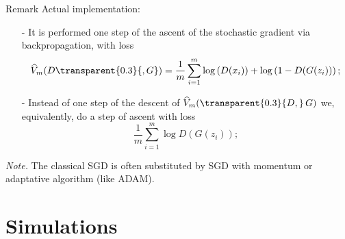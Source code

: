 \documentclass{beamer}
\begin{document}
	\begin{frame}
		\begin{block}{Remark}
			Actual implementation:
			\begin{itemize}
				\item[-] 
					{} It is performed one step of the ascent of the stochastic gradient via backpropagation, with loss 
					\vspace{-0.3cm}
					\begin{equation*}
						\widehat{V}_m(D {\transparent{0.3}{, G}}) = \frac{1}{m} \sum_{i = 1}^{m} \log{D(x_i)} + \log{1 - D(G(z_i))};
					\end{equation*}
					\vspace{-0.6cm}
				\item[-] 
				{} Instead of one step of the descent of $\widehat{V}_m({\transparent{0.3}{D,}} \, G)$ we, equivalently, do a step of ascent with loss 
					\vspace{-0.3cm}
					\begin{equation*}
						\frac{1}{m} \sum_{i = 1}^{m} \log{D(G(z_i))};
					\end{equation*}
			\end{itemize}
			\textit{Note.} The classical SGD is often substituted by SGD with momentum or adaptative algorithm (like ADAM).
		\end{block}
	\end{frame}

	\section{Simulations}
\end{document}
